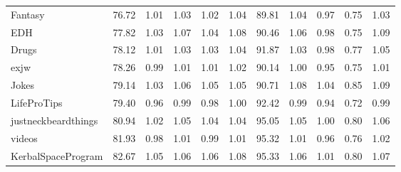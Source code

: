 \begin{tabular}{lrrrrrrrrrr}
Fantasy             &          76.72 &                1.01 &                1.03 &                1.02 &                1.04 &                 89.81 &                       1.04 &                       0.97 &                       0.75 &                       1.03 \\
EDH                 &          77.82 &                1.03 &                1.07 &                1.04 &                1.08 &                 90.46 &                       1.06 &                       0.98 &                       0.75 &                       1.09 \\
Drugs               &          78.12 &                1.01 &                1.03 &                1.03 &                1.04 &                 91.87 &                       1.03 &                       0.98 &                       0.77 &                       1.05 \\
exjw                &          78.26 &                0.99 &                1.01 &                1.01 &                1.02 &                 90.14 &                       1.00 &                       0.95 &                       0.75 &                       1.01 \\
Jokes               &          79.14 &                1.03 &                1.06 &                1.05 &                1.05 &                 90.71 &                       1.08 &                       1.04 &                       0.85 &                       1.09 \\
LifeProTips         &          79.40 &                0.96 &                0.99 &                0.98 &                1.00 &                 92.42 &                       0.99 &                       0.94 &                       0.72 &                       0.99 \\
justneckbeardthings &          80.94 &                1.02 &                1.05 &                1.04 &                1.04 &                 95.05 &                       1.05 &                       1.00 &                       0.80 &                       1.06 \\
videos              &          81.93 &                0.98 &                1.01 &                0.99 &                1.01 &                 95.32 &                       1.01 &                       0.96 &                       0.76 &                       1.02 \\
KerbalSpaceProgram  &          82.67 &                1.05 &                1.06 &                1.06 &                1.08 &                 95.33 &                       1.06 &                       1.01 &                       0.80 &                       1.07 \\

\end{tabular}
